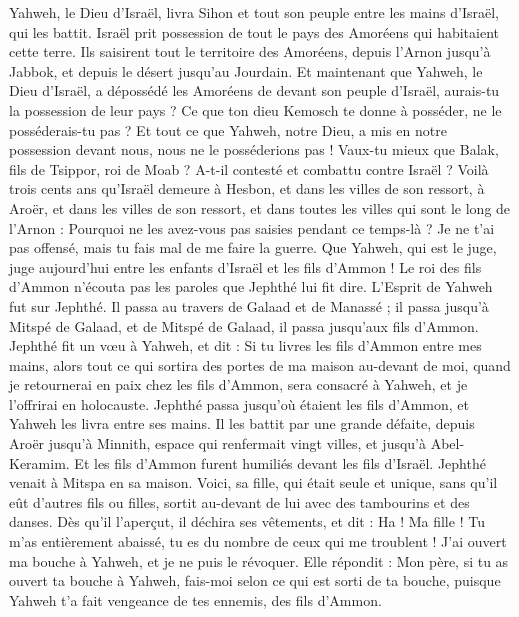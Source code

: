\begin{multicols}{2}
Yahweh, le Dieu d'Israël, livra Sihon et tout son peuple entre les mains d'Israël, qui les battit. Israël prit possession de tout le pays des Amoréens qui habitaient cette terre.
Ils saisirent tout le territoire des Amoréens, depuis l'Arnon jusqu'à Jabbok, et depuis le désert jusqu'au Jourdain.
Et maintenant que Yahweh, le Dieu d'Israël, a dépossédé les Amoréens de devant son peuple d'Israël, aurais-tu la possession de leur pays ?
Ce que ton dieu Kemosch te donne à posséder, ne le posséderais-tu pas ? Et tout ce que Yahweh, notre Dieu, a mis en notre possession devant nous, nous ne le posséderions pas !
Vaux-tu mieux que Balak, fils de Tsippor, roi de Moab ? A-t-il contesté et combattu contre Israël ?
Voilà trois cents ans qu'Israël demeure à Hesbon, et dans les villes de son ressort, à Aroër, et dans les villes de son ressort, et dans toutes les villes qui sont le long de l'Arnon : Pourquoi ne les avez-vous pas saisies pendant ce temps-là ?
Je ne t'ai pas offensé, mais tu fais mal de me faire la guerre. Que Yahweh, qui est le juge, juge aujourd'hui entre les enfants d'Israël et les fils d'Ammon !
Le roi des fils d'Ammon n'écouta pas les paroles que Jephthé lui fit dire.
L'Esprit de Yahweh fut sur Jephthé. Il passa au travers de Galaad et de Manassé ; il passa jusqu'à Mitspé de Galaad, et de Mitspé de Galaad, il passa jusqu'aux fils d'Ammon.
Jephthé fit un vœu à Yahweh, et dit : Si tu livres les fils d'Ammon entre mes mains,
alors tout ce qui sortira des portes de ma maison au-devant de moi, quand je retournerai en paix chez les fils d'Ammon, sera consacré à Yahweh, et je l'offrirai en holocauste.
Jephthé passa jusqu'où étaient les fils d'Ammon, et Yahweh les livra entre ses mains.
Il les battit par une grande défaite, depuis Aroër jusqu'à Minnith, espace qui renfermait vingt villes, et jusqu'à Abel-Keramim. Et les fils d'Ammon furent humiliés devant les fils d'Israël.
Jephthé venait à Mitspa en sa maison. Voici, sa fille, qui était seule et unique, sans qu'il eût d'autres fils ou filles, sortit au-devant de lui avec des tambourins et des danses.
Dès qu'il l'aperçut, il déchira ses vêtements, et dit : Ha ! Ma fille ! Tu m'as entièrement abaissé, tu es du nombre de ceux qui me troublent ! J'ai ouvert ma bouche à Yahweh, et je ne puis le révoquer.
Elle répondit : Mon père, si tu as ouvert ta bouche à Yahweh, fais-moi selon ce qui est sorti de ta bouche, puisque Yahweh t'a fait vengeance de tes ennemis, des fils d'Ammon.

\end{multicols}
